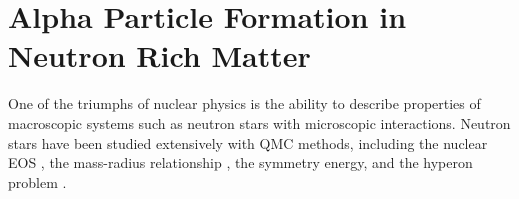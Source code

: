 \section{Alpha Particle Formation in Neutron Rich Matter}
One of the triumphs of nuclear physics is the ability to describe properties of macroscopic systems such as neutron stars with microscopic interactions. Neutron stars have been studied extensively with QMC methods, including the nuclear EOS , the mass-radius relationship \cite{???}, the symmetry energy, and the hyperon problem \cite{lonardoni2015,gandolfi2017}.
